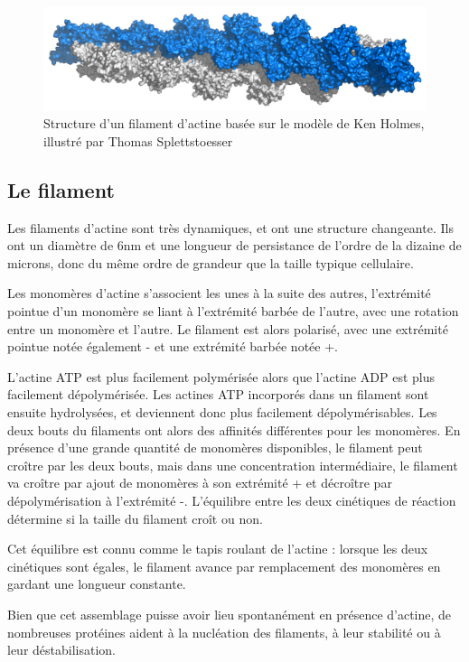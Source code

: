 \begin{figure}
\includegraphics[scale=0.3]{Actin_filament_atomic_model.png}
\caption{Structure d'un filament d'actine basée sur le modèle de Ken Holmes, illustré par Thomas Splettstoesser}
\end{figure}

\subsection{Le filament}

Les filaments d'actine sont très dynamiques, et ont une structure changeante. Ils ont un diamètre de 6nm et une longueur de persistance de l'ordre de la dizaine de microns, donc du même ordre de grandeur que la taille typique cellulaire. 

Les monomères d'actine s'associent les unes à la suite des autres, l'extrémité pointue d'un monomère se liant à l'extrémité barbée de l'autre, avec une rotation entre un monomère et l'autre. 
Le filament est alors polarisé, avec une extrémité pointue notée également - et une extrémité barbée notée +. 

L'actine ATP est plus facilement polymérisée alors que l'actine ADP est plus facilement dépolymérisée. 
Les actines ATP incorporés dans un filament sont ensuite hydrolysées, et deviennent donc plus facilement dépolymérisables.
Les deux bouts du filaments ont alors des affinités différentes pour les monomères. En présence d'une grande quantité de monomères disponibles, le filament peut croître par les deux bouts, mais dans une concentration intermédiaire, le filament va croître par ajout de monomères à son extrémité + et décroître par dépolymérisation à l'extrémité -. L'équilibre entre les deux cinétiques de réaction détermine si la taille du filament croît ou non. 

Cet équilibre est connu comme le \og tapis roulant \fg de l'actine : lorsque les deux cinétiques sont égales, le filament avance par remplacement des monomères en gardant une longueur constante. 

Bien que cet assemblage puisse avoir lieu spontanément en présence d'actine, de nombreuses protéines aident à la nucléation des filaments, à leur stabilité ou à leur déstabilisation. 


